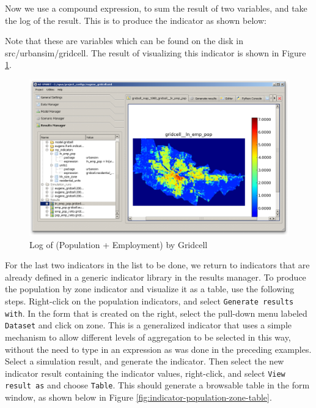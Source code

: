 Now we use a compound expression, to sum the result of two variables, and take the log of the result.  This is to produce the indicator as shown below:


Note that these are variables which can be found on the disk in src/urbansim/gridcell.  The result of visualizing this indicator is shown in Figure \ref{fig:indicator-ln-emp-pop}.

\begin{figure}[htp]
\begin{center}
\includegraphics[scale=0.4]{graphics/indicator-ln-emp-pop.png}
\end{center}
\caption{Log of (Population + Employment) by Gridcell}
\label{fig:indicator-ln-emp-pop}
\end{figure}

For the last two indicators in the list to be done, we return to indicators that are already defined in a generic indicator library in the results manager.  To produce the population by zone indicator and visualize it as a table, use the following steps.  Right-click on the population indicators, and select \verb#Generate results with#.  In the form that is created on the right, select the pull-down menu labeled \verb#Dataset# and click on zone.  This is a generalized indicator that uses a simple mechanism to allow different levels of aggregation to be selected in this way, without the need to type in an expression as was done in the preceding examples.  Select a simulation result, and generate the indicator.  Then select the new indicator result containing the indicator values, right-click, and select \verb#View result as# and choose \verb#Table#.  This should generate a browsable table in the form window, as shown below in Figure \ref{fig:indicator-population-zone-table}.

